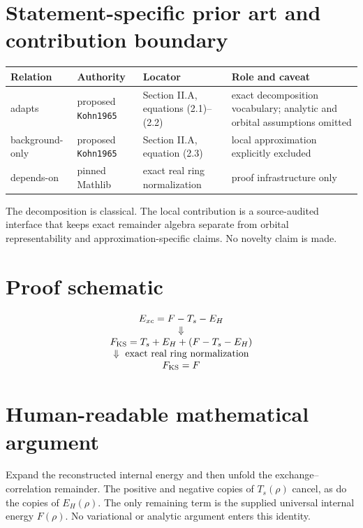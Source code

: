 \section{Statement-specific prior art and contribution boundary}
\begin{tabularx}{\textwidth}{@{}lYYY@{}}
\toprule
Relation & Authority & Locator & Role and caveat \\
\midrule
adapts & proposed \texttt{Kohn1965} & Section II.A, equations (2.1)--(2.2) & exact decomposition vocabulary; analytic and orbital assumptions omitted \\
background-only & proposed \texttt{Kohn1965} & Section II.A, equation (2.3) & local approximation explicitly excluded \\
depends-on & pinned Mathlib & exact real ring normalization & proof infrastructure only \\
\bottomrule
\end{tabularx}
The decomposition is classical.  The local contribution is a source-audited interface that keeps
exact remainder algebra separate from orbital representability and approximation-specific claims.
No novelty claim is made.

\section{Proof schematic}
\[
\begin{array}{c}
 E_{xc}=F-T_s-E_H\\
 \Downarrow\\
 F_{\rm KS}=T_s+E_H+(F-T_s-E_H)\\
 \Downarrow\ \text{exact real ring normalization}\\
 F_{\rm KS}=F
\end{array}
\]

\section{Human-readable mathematical argument}
Expand the reconstructed internal energy and then unfold the exchange--correlation remainder.  The
positive and negative copies of \(T_s(\rho)\) cancel, as do the copies of \(E_H(\rho)\).  The only
remaining term is the supplied universal internal energy \(F(\rho)\).  No variational or analytic
argument enters this identity.

